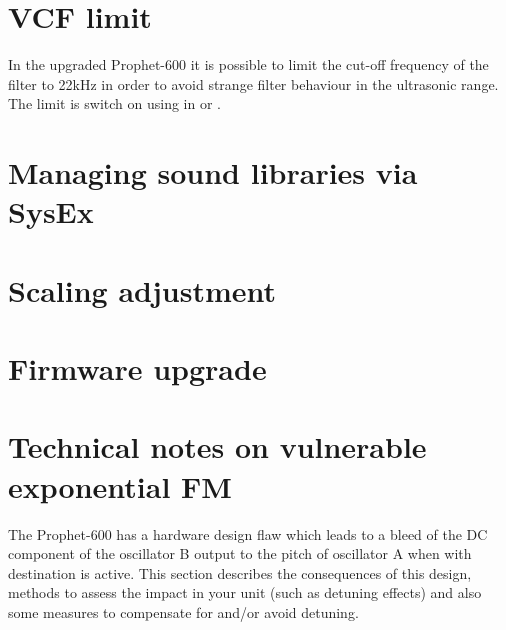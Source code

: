 \documentclass[landscape, 11pt, oneside, twoside]{report}
\newenvironment{flowtext}{\addmargin[0cm]{0cm}}{\endaddmargin} %
\begin{document}
\begin{flowtext}
\section{VCF limit}\label{limitsett}

In the upgraded Prophet-600 it is possible to limit the cut-off frequency of the filter to 22kHz in order to avoid strange filter behaviour in the ultrasonic range. The limit is switch on using  in \shiftmode or \shiftlock. 

\section{Managing sound libraries via SysEx}\label{patchmgmt}



\section{Scaling adjustment}\label{scalingadj}



\section{Firmware upgrade}\label{fwupgrade}

  

\section{Technical notes on vulnerable exponential FM}\label{fm}

The Prophet-600 has a hardware design flaw which leads to a bleed of the DC component of the oscillator B output to the pitch of oscillator A when \polymodosc with destination \polymodfreq is active. This section describes the consequences of this design, methods to assess the impact in your unit (such as detuning effects) and also some measures to compensate for and/or avoid detuning.


\end{flowtext}
\end{document}
